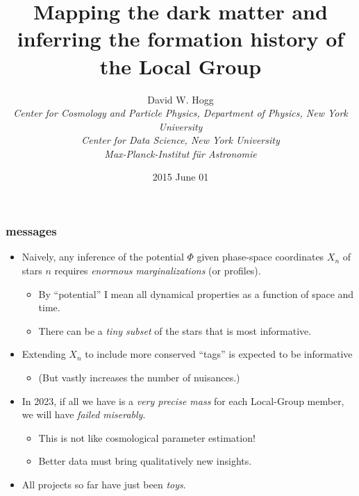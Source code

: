 \documentclass[pdftex]{beamer}
\title{Mapping the dark matter and inferring the formation history of the Local Group}
\author[David W. Hogg (NYU)]{David W. Hogg \\
  \textsl{\footnotesize Center for Cosmology and Particle Physics, Department of Physics,
                 New York University}\\
  \textsl{\footnotesize Center for Data Science,
                 New York University}\\
  \textsl{\footnotesize Max-Planck-Institut f\"ur Astronomie}}
\date{2015 June 01}
\begin{document}
\begin{frame}
  \titlepage
\end{frame}

\newcommand{\messages}{%
\begin{frame}
  \frametitle{messages}
  \begin{itemize}
  \item Naively, any inference of the potential $\Phi$ given
    phase-space coordinates $X_n$ of stars $n$ requires \emph{enormous
      marginalizations} (or profiles).
    \begin{itemize}
    \item By ``potential'' I mean all dynamical properties as a function of space and time.
    \item There can be a \emph{tiny subset} of the stars that is most informative.
    \end{itemize}
  \item Extending $X_n$ to include more conserved ``tags'' is expected to be informative
    \begin{itemize}
    \item (But vastly increases the number of nuisances.)
    \end{itemize}
  \item In 2023, if all we have is a \emph{very precise mass} for
    each Local-Group member, we will have \emph{failed miserably}.
    \begin{itemize}
    \item This is not like cosmological parameter estimation!
    \item Better data must bring qualitatively new insights.
    \end{itemize}
  \item All projects so far have just been \emph{toys}.
  \end{itemize}
\end{frame}}

\messages
\end{document}
